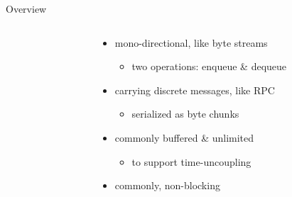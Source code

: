 \documentclass{beamer}\mode<presentation>{\usetheme{AMSBolognaFC}}
\begin{document}
\begin{frame}{Overview}
\begin{columns}
\begin{column}{.26\linewidth}
\begin{center}
            \end{center}
        \end{column}
        \hfill
        \begin{column}{.72\linewidth}
            \begin{itemize}
                \item \alert{mono-directional}, like byte streams
                \begin{itemize}
                    \item two operations: enqueue \& dequeue
                \end{itemize}

                \smallskip

                \item carrying discrete \alert{messages}, like RPC
                \begin{itemize}
                    \item serialized as byte chunks
                \end{itemize}

                \smallskip

                \item commonly \alert{buffered} \& unlimited
                \begin{itemize}
                    \item to support \alert{time-uncoupling}
                \end{itemize}

                \smallskip

                \item commonly, \alert{non-blocking}

%
            \end{itemize}
        \end{column}
    \end{columns}
\end{frame}
\end{document}
